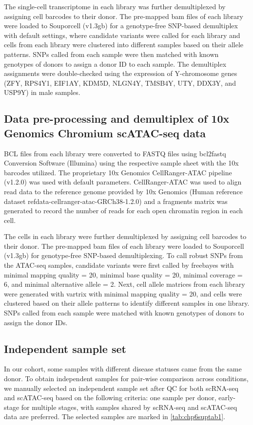 \documentclass{book}
\begin{document}
\begin{refsection}
The single-cell transcriptome in each library was further demultiplexed by assigning cell barcodes to their donor.
The pre-mapped bam files of each library were loaded to Souporcell (v1.3gb) \cite{Heaton2020Souporcell} for a genotype-free SNP-based demultiplex with default settings, where candidate variants were called for each library and cells from each library were clustered into different samples based on their allele patterns.
SNPs called from each sample were then matched with known genotypes of donors to assign a donor ID to each sample.
The demultiplex assignments were double-checked using the expression of Y-chromosome genes (ZFY, RPS4Y1, EIF1AY, KDM5D, NLGN4Y, TMSB4Y, UTY, DDX3Y, and USP9Y) in male samples.

 
\subsection*{Data pre-processing and demultiplex of 10x Genomics Chromium scATAC-seq data}
BCL files from each library were converted to FASTQ files using bcl2fastq Conversion Software (Illumina) using the respective sample sheet with the 10x barcodes utilized.
The proprietary 10x Genomics CellRanger-ATAC pipeline (v1.2.0) was used with default parameters.
CellRanger-ATAC was used to align read data to the reference genome provided by 10x Genomics (Human reference dataset refdata-cellranger-atac-GRCh38-1.2.0) and a fragments matrix was generated to record the number of reads for each open chromatin region in each cell.

The cells in each library were further demultiplexed by assigning cell barcodes to their donor.
The pre-mapped bam files of each library were loaded to Souporcell (v1.3gb) \cite{Heaton2020Souporcell} for genotype-free SNP-based demultiplexing.
To call robust SNPs from the ATAC-seq samples, candidate variants were first called by freebayes with minimal mapping quality = 20, minimal base quality = 20, minimal coverage = 6, and minimal alternative allele = 2.
Next, cell allele matrices from each library were generated with vartrix with minimal mapping quality = 20, and cells were clustered based on their allele patterns to identify different samples in one library.
SNPs called from each sample were matched with known genotypes of donors to assign the donor IDs.

\subsection*{Independent sample set}
In our cohort, some samples with different disease statuses came from the same donor.
To obtain independent samples for pair-wise comparison across conditions, we manually selected an independent sample set after QC for both scRNA-seq and scATAC-seq based on the following criteria: one sample per donor, early-stage for multiple stages, with samples shared by scRNA-seq and scATAC-seq data are preferred.
The selected samples are marked in \ref{tab:chp6suptab1}.
 


\end{refsection}
\end{document}
